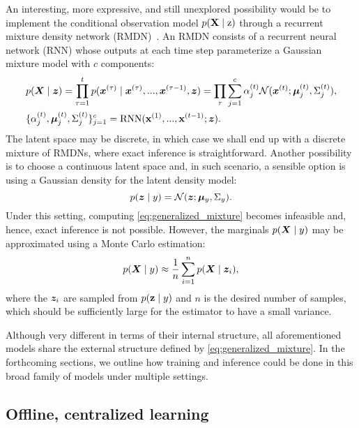 An interesting, more expressive, and still unexplored possibility would be to implement the conditional observation model $p({\mathbf{X}} \mid {\textnormal{z}})$ through a recurrent mixture density network (RMDN)~\cite{Bishop1994, Graves2013, Bazzani2016}. An RMDN consists of a recurrent neural network (RNN) whose outputs at each time step parameterize a Gaussian mixture model with $c$ components:
\begin{align}
& p({\bm{X}} \mid {\bm{z}}) = \prod_{\tau=1}^t p({\bm{x}}^{(\tau)} \mid {\bm{x}}^{(\tau)}, ..., {\bm{x}}^{(\tau-1)}, {\bm{z}}) = \prod_\tau \sum_{j=1}^c \alpha_j^{(t)} \mathcal{N}({\bm{x}}^{(t)} ; {\bm{\mu}}_j^{(t)}, \Sigma_j^{(t)}),\\
& \lbrace \alpha_j^{(t)}, {\bm{\mu}}_j^{(t)}, \Sigma_j^{(t)} \rbrace_{j=1}^c = \text{RNN}({\mathbf{x}}^{(1)}, ..., {\mathbf{x}}^{(t-1)}; {\bm{z}}).
\end{align}
The latent space may be discrete, in which case we shall end up with a discrete mixture of RMDNs, where exact inference is straightforward. Another possibility is to choose a continuous latent space and, in such scenario, a sensible option is using a Gaussian density for the latent density model:
\begin{equation}
p({\bm{z}} \mid y) = \mathcal{N}({\bm{z}} ; {\bm{\mu}}_y, \Sigma_y).
\end{equation}
Under this setting, computing \eqref{eq:generalized_mixture} becomes infeasible and, hence, exact inference is not possible. However, the marginals $p({\bm{X}} \mid y)$ may be approximated using a Monte Carlo estimation:
\begin{equation}
p({\bm{X}} \mid y) \approx \frac{1}{n}\sum_{i=1}^n p({\bm{X}} \mid {\bm{z}}_i),
\end{equation}
where the ${\bm{z}}_i$ are sampled from $p({\mathbf{z}} \mid y)$ and $n$ is the desired number of samples, which should be sufficiently large for the estimator to have a small variance.

Although very different in terms of their internal structure, all aforementioned models share the external structure defined by \eqref{eq:generalized_mixture}. In the forthcoming sections, we outline how training and inference could be done in this broad family of models under multiple settings.

\subsection{Offline, centralized learning}
\label{sec:offline_learning}

